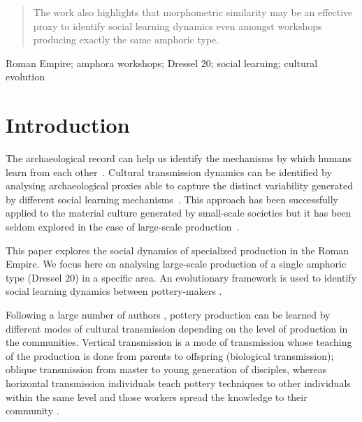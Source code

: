 \documentclass[review]{elsarticle}
\begin{document}
\begin{frontmatter}
\begin{abstract}
The work also highlights that morphometric similarity may be an effective proxy to identify social learning dynamics even amongst workshops producing exactly the same amphoric type. 

\end{abstract}


\begin{keyword}
Roman Empire; amphora workshops; Dressel 20; social learning; cultural evolution
\end{keyword}

\end{frontmatter}

\linenumbers

\section{Introduction}

The archaeological record can help us identify the mechanisms by which humans learn from each other~\citep{richerson2005not,eerkens_jelmer_cultural_2007}. Cultural transmission dynamics can be identified by analysing archaeological proxies able to capture the distinct variability generated by different social learning mechanisms~\citep{shennan_ceramic_2001,eerkens_jelmer_cultural_2005, gandon_copying_2014}. This approach has been successfully applied to the material culture generated by small-scale societies but it has been seldom explored in the case of large-scale production~\citep{shennan_isolation-by-distance_2015}.

This paper explores the social dynamics of specialized production in the Roman Empire. We focus here on analysing large-scale production of a single amphoric type (Dressel 20) in a specific area. An evolutionary framework is used to identify social learning dynamics between pottery-makers \citep{shennan_evolution_2008,mesoudi_cultural_2015}. 

Following a large number of authors \citep{neff1992ceramics,shennan_genes_2002,bowser_learning_2008,hosfield_modes_2009}, pottery production can be learned by different modes of cultural transmission depending on the level of production in the communities. Vertical transmission is a mode of transmission whose teaching of the production is done from parents to offspring (biological transmission); oblique transmission from master to young generation of disciples, whereas horizontal transmission individuals teach pottery techniques to other individuals within the same level and those workers spread the knowledge to their community \citep{cavalli-sforza_cultural_1981, acerbi_cultural_2006}.
\end{document}
